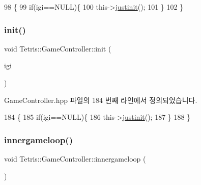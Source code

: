 \begin{DoxyCode}
98                                               \{
99                 \textcolor{keywordflow}{if}(igi==NULL)\{
100                     this->\hyperlink{class_tetris_1_1_game_controller_aef406397d4719c9edd49774d0343ce05}{justinit}();
101                 \}
102             \}
\end{DoxyCode}
\mbox{\label{class_tetris_1_1_game_controller_a9c0f88f11b8b75063e63bcbc621dc0be}} 
\subsubsection{\texorpdfstring{init()}{init()}\hspace{0.1cm}{\footnotesize\ttfamily [2/2]}}
{\footnotesize\ttfamily void Tetris\+::\+Game\+Controller\+::init (\begin{DoxyParamCaption}\item[{\hyperlink{class_tetris_1_1_init_game_info}{Init\+Game\+Info} $\ast$}]{igi }\end{DoxyParamCaption})\hspace{0.3cm}{\ttfamily [inline]}}



Game\+Controller.\+hpp 파일의 184 번째 라인에서 정의되었습니다.


\begin{DoxyCode}
184                                         \{
185                 \textcolor{keywordflow}{if}(igi==NULL)\{
186                     this->\hyperlink{class_tetris_1_1_game_controller_aef406397d4719c9edd49774d0343ce05}{justinit}();
187                 \}
188             \}
\end{DoxyCode}
\mbox{\label{class_tetris_1_1_game_controller_a9dd5159934835ef54cb3c0b24cbc1fd6}} 
\subsubsection{\texorpdfstring{innergameloop()}{innergameloop()}\hspace{0.1cm}{\footnotesize\ttfamily [1/2]}}
{\footnotesize\ttfamily void Tetris\+::\+Game\+Controller\+::innergameloop (\begin{DoxyParamCaption}{ }\end{DoxyParamCaption})}



